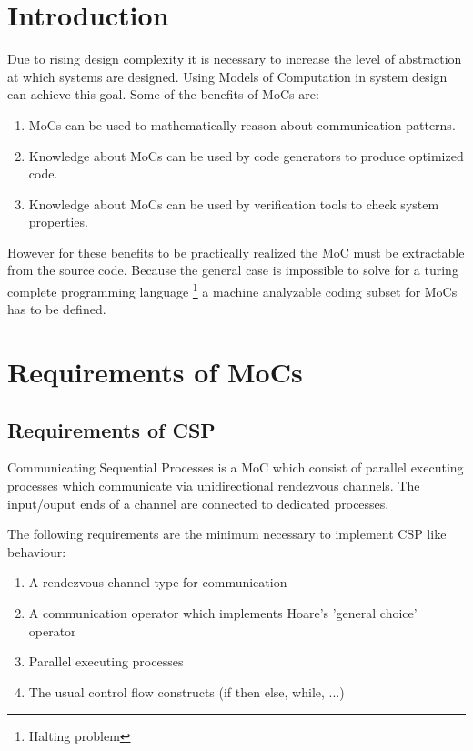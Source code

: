 \newcommand{\resdir}{../../../HscdTeXRes/}



\usepackage{multirow}


\clearpage
\tableofcontents
\clearpage

\section{Introduction\label{intro}}
Due to rising design complexity it is necessary to increase
the level of abstraction at which systems are designed. Using
Models of Computation in system design can achieve this goal.
Some of the benefits of MoCs are:
\begin{enumerate}
\item MoCs can be used to mathematically reason about communication
patterns.

\item Knowledge about MoCs can be used by code generators to produce
optimized code.

\item Knowledge about MoCs can be used by verification tools to
check system properties.
\end{enumerate}
However for these benefits to be practically realized the
MoC must be extractable from the source code. Because the general case
is impossible to solve for a turing complete programming language
\footnote{Halting problem} a machine analyzable coding subset for
MoCs has to be defined.

\section{Requirements of MoCs}

\subsection{Requirements of CSP}
Communicating Sequential Processes \cite{csphoare:1985}
is a MoC which consist of parallel executing processes
which communicate via unidirectional rendezvous channels.
The input/ouput ends of a channel are connected to dedicated
processes.

The following requirements are the minimum necessary to
implement CSP like behaviour:

\begin{enumerate}
\item A rendezvous channel type for communication
\item A communication operator which implements Hoare's 'general choice' operator
\item Parallel executing processes
\item The usual control flow constructs (if then else, while, ...)
\end{enumerate}


